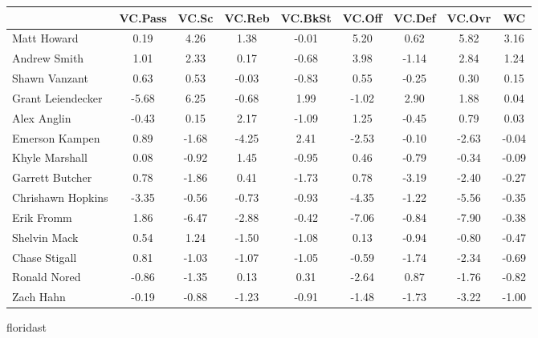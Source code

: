 \documentclass[10pt,letterpaper]{article}
\begin{document}
\begin{table}[ht]
\begin{center}
\begin{tabular}{lcccccccc}
  \hline
 & VC.Pass & VC.Sc & VC.Reb & VC.BkSt & VC.Off & VC.Def & VC.Ovr & WC \\ 
  \hline
Matt Howard & 0.19 & 4.26 & 1.38 & -0.01 & 5.20 & 0.62 & 5.82 & 3.16 \\ 
  Andrew Smith & 1.01 & 2.33 & 0.17 & -0.68 & 3.98 & -1.14 & 2.84 & 1.24 \\ 
  Shawn Vanzant & 0.63 & 0.53 & -0.03 & -0.83 & 0.55 & -0.25 & 0.30 & 0.15 \\ 
  Grant Leiendecker & -5.68 & 6.25 & -0.68 & 1.99 & -1.02 & 2.90 & 1.88 & 0.04 \\ 
  Alex Anglin & -0.43 & 0.15 & 2.17 & -1.09 & 1.25 & -0.45 & 0.79 & 0.03 \\ 
  Emerson Kampen & 0.89 & -1.68 & -4.25 & 2.41 & -2.53 & -0.10 & -2.63 & -0.04 \\ 
  Khyle Marshall & 0.08 & -0.92 & 1.45 & -0.95 & 0.46 & -0.79 & -0.34 & -0.09 \\ 
  Garrett Butcher & 0.78 & -1.86 & 0.41 & -1.73 & 0.78 & -3.19 & -2.40 & -0.27 \\ 
  Chrishawn Hopkins & -3.35 & -0.56 & -0.73 & -0.93 & -4.35 & -1.22 & -5.56 & -0.35 \\ 
  Erik Fromm & 1.86 & -6.47 & -2.88 & -0.42 & -7.06 & -0.84 & -7.90 & -0.38 \\ 
  Shelvin Mack & 0.54 & 1.24 & -1.50 & -1.08 & 0.13 & -0.94 & -0.80 & -0.47 \\ 
  Chase Stigall & 0.81 & -1.03 & -1.07 & -1.05 & -0.59 & -1.74 & -2.34 & -0.69 \\ 
  Ronald Nored & -0.86 & -1.35 & 0.13 & 0.31 & -2.64 & 0.87 & -1.76 & -0.82 \\ 
  Zach Hahn & -0.19 & -0.88 & -1.23 & -0.91 & -1.48 & -1.73 & -3.22 & -1.00 \\ 
   \hline
\end{tabular}
\end{center}
\end{table}
\newpage
\begin{center}
floridast 
\end{center}
\end{document}
